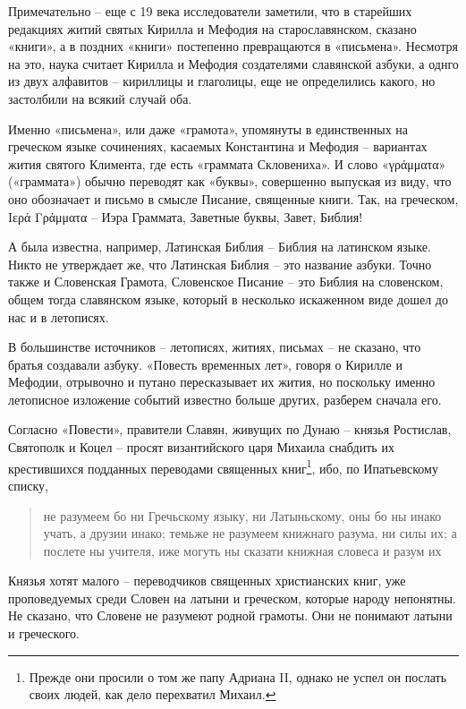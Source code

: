 Примечательно – еще с 19 века исследователи заметили, что в старейших редакциях житий святых Кирилла и Мефодия на старославянском, сказано «книги», а в поздних «книги» постепенно превращаются в «письмена». Несмотря на это, наука считает Кирилла и Мефодия создателями славянской азбуки, а однго из двух алфавитов – кириллицы и глаголицы, еще не определились какого, но застолбили на всякий случай оба.

Именно «письмена», или даже «грамота», упомянуты в единственных на греческом языке сочинениях, касаемых Константина и Мефодия – вариантах жития святого Климента, где есть «граммата Скловениха». И слово «γράμματα» («граммата») обычно переводят как «буквы», совершенно выпуская из виду, что оно обозначает и письмо в смысле Писание, священные книги. Так, на греческом, Iερά Γράμματα – Иэра Граммата, Заветные буквы, Завет, Библия!

А была известна, например, Латинская Библия – Библия на латинском языке. Никто не утверждает же, что Латинская Библия – это название азбуки. Точно также и Словенская Грамота, Словенское Писание – это Библия на словенском, общем тогда славянском языке, который в несколько искаженном виде дошел до нас и в летописях.

В большинстве источников – летописях, житиях, письмах – не сказано, что братья создавали азбуку. «Повесть временных лет», говоря о Кирилле и Мефодии, отрывочно и путано пересказывает их жития, но поскольку именно летописное изложение событий известно больше других, разберем сначала его.

Согласно «Повести», правители Славян, живущих по Дунаю – князья Ростислав, Святополк и Коцел – просят византийского царя Михаила снабдить их крестившихся подданных переводами священных книг\footnote{Прежде они просили о том же папу Адриана II, однако не успел он послать своих людей, как дело перехватил Михаил.}, ибо, по Ипатьевскому списку,

\begin{quotation}
не разумеем бо ни Гречьскому языку, ни Латыньскому, оны бо ны инако учать, а друзии инако; темьже не разумеем книжнаго разума, ни силы их; а послете ны учителя, иже могуть ны сказати книжная словеса и разум их
\end{quotation}

Князья хотят малого – переводчиков священных христианских книг, уже проповедуемых среди Словен на латыни и греческом, которые народу непонятны. Не сказано, что Словене не разумеют родной грамоты. Они не понимают латыни и греческого.

